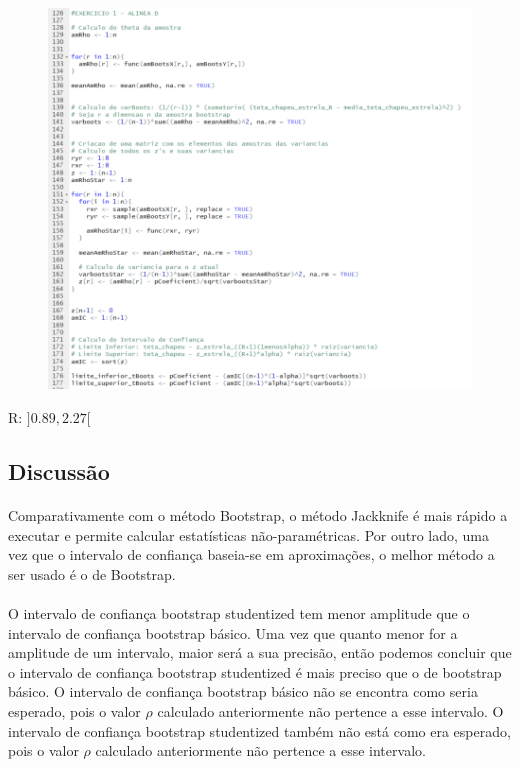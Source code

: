 \documentclass{article}
\begin{document}
\begin{enumerate}[(a)]
					\begin{figure}[!h]
						\includegraphics[scale=0.6]{ex1d)}
					\end{figure}

					R: $]0.89,  2.27[$
					
\newpage
	
					\subsection*{Discussão}
	
						\paragraph*{}
							 Comparativamente com o método Bootstrap, o método Jackknife é mais rápido a executar e permite calcular estatísticas não-paramétricas. Por outro lado, uma vez que o intervalo de confiança baseia-se em aproximações, o melhor método a ser usado é o de Bootstrap.\\ 
					
						\paragraph*{}
							O intervalo de confiança bootstrap studentized tem menor amplitude que o intervalo de confiança bootstrap básico. Uma vez que quanto menor for a amplitude de um intervalo, maior será a sua precisão, então podemos concluir que o intervalo de confiança bootstrap studentized é mais preciso que o de bootstrap básico.
							O intervalo de confiança bootstrap básico não se encontra como seria esperado, pois o valor $\rho$ calculado anteriormente não pertence a esse intervalo.
							O intervalo de confiança bootstrap studentized também não está como era esperado, pois o valor $\rho$ calculado anteriormente não pertence a esse intervalo. 	
				
			\end{enumerate}		
				
\end{document}
